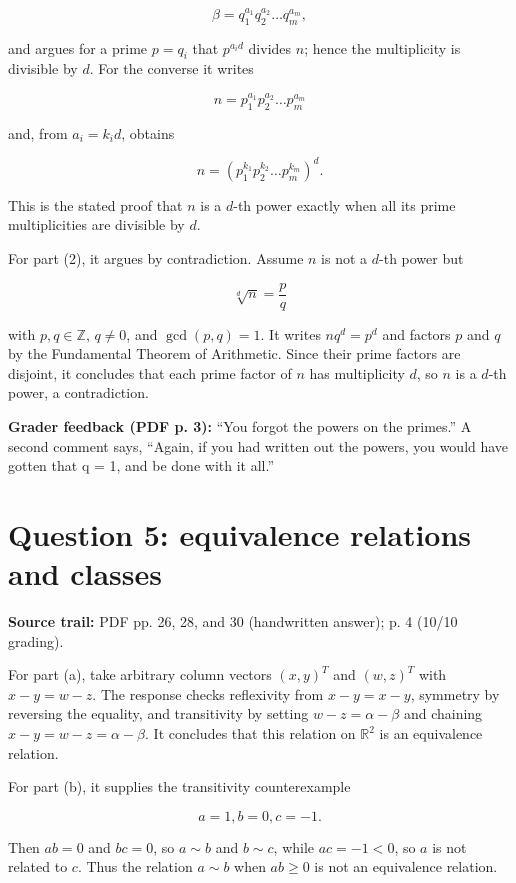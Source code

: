 \[\beta = q_{1}^{a_{1}}q_{2}^{a_{2}}\ldots q_{m}^{a_{m}},\]

and argues for a prime \(p = q_{i}\) that \(p^{a_{i}d}\) divides \(n\); hence the multiplicity is divisible by \(d\). For the converse it writes

\[n = p_{1}^{a_{1}}p_{2}^{a_{2}}\ldots p_{m}^{a_{m}}\]

and, from \(a_{i} = k_{i}d\), obtains

\[n = \left( {p_{1}^{k_{1}}p_{2}^{k_{2}}\ldots p_{m}^{k_{m}}} \right)^{d}.\]

This is the stated proof that \(n\) is a \(d\)-th power exactly when all its prime multiplicities are divisible by \(d\).

For part (2), it argues by contradiction. Assume \(n\) is not a \(d\)-th power but

\[\sqrt[d]{n} = \frac{p}{q}\]

with \(p,q \in \mathbb{Z}\), \(q \neq 0\), and \(\gcd\left( {p,q} \right) = 1\). It writes \(nq^{d} = p^{d}\) and factors \(p\) and \(q\) by the Fundamental Theorem of Arithmetic. Since their prime factors are disjoint, it concludes that each prime factor of \(n\) has multiplicity \(d\), so \(n\) is a \(d\)-th power, a contradiction.

\textbf{Grader feedback (PDF p. 3):} ``You forgot the powers on the primes.'' A second comment says, ``Again, if you had written out the powers, you would have gotten that q = 1, and be done with it all.''

\section{Question 5: equivalence relations and classes}

\textbf{Source trail:} PDF pp. 26, 28, and 30 (handwritten answer); p. 4 (10/10 grading).

For part (a), take arbitrary column vectors \(\left( {x,y} \right)^{T}\) and \(\left( {w,z} \right)^{T}\) with \(x - y = w - z\). The response checks reflexivity from \(x - y = x - y\), symmetry by reversing the equality, and transitivity by setting \(w - z = \alpha - \beta\) and chaining \(x - y = w - z = \alpha - \beta\). It concludes that this relation on \(\mathbb{R}^{2}\) is an equivalence relation.

For part (b), it supplies the transitivity counterexample

\[a = 1,b = 0,c = - 1.\]

Then \(ab = 0\) and \(bc = 0\), so \(a \sim b\) and \(b \sim c\), while \(ac = - 1 < 0\), so \(a\) is not related to \(c\). Thus the relation \(a \sim b\) when \(ab \geq 0\) is not an equivalence relation.

